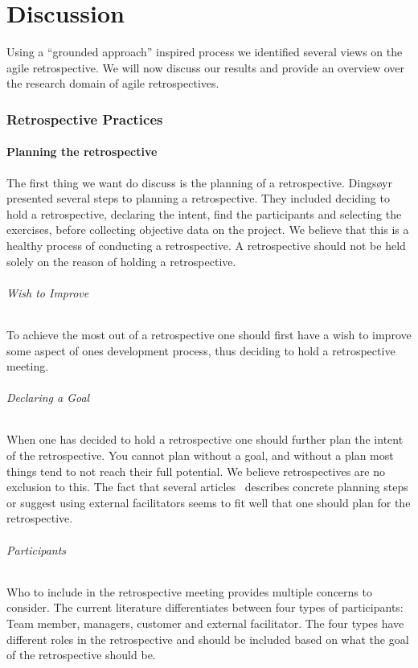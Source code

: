 \documentclass[12pt]{article}
\begin{document}
\clearpage

\part{Discussion}
Using a ``grounded approach'' inspired process we identified several views on the agile retrospective. We will now discuss our results and provide an overview over the research domain of agile retrospectives.

\section{Retrospective Practices}
\subsection{Planning the retrospective}
The first thing we want do discuss is the planning of a retrospective. Dingsøyr~\cite{Dingsoyr2005} presented several steps to planning a retrospective. They included deciding to hold a retrospective, declaring the intent, find the participants and selecting the exercises, before collecting objective data on the project. We believe that this is a healthy process of conducting a retrospective. A retrospective should not be held solely on the reason of holding a retrospective. 

\paragraph{Wish to Improve} 
To achieve the most out of a retrospective one should first have a wish to improve some aspect of ones development process, thus deciding to hold a retrospective meeting. 

\paragraph{Declaring a Goal}
When one has decided to hold a retrospective one should further plan the intent of the retrospective. You cannot plan without a goal, and without a plan most things tend to not reach their full potential. We believe retrospectives are no exclusion to this. The fact that several articles~\cite{Dingsoyr2005, Bjornson2009, Hanssen2003, Maham2008, Birk2002, Moe2001} describes concrete planning steps or suggest using external facilitators seems to fit well that one should plan for the retrospective. 

\paragraph{Participants}
Who to include in the retrospective meeting provides multiple concerns to consider. The current literature differentiates between four types of participants: Team member, managers, customer and external facilitator. The four types have different roles in the retrospective and should be included based on what the goal of the retrospective should be. 
\end{document}
